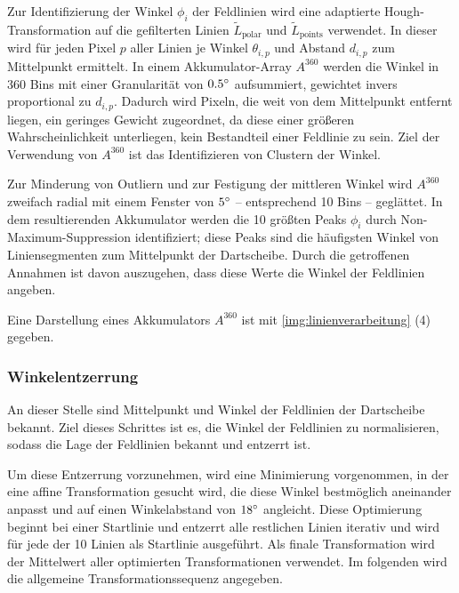 Zur Identifizierung der Winkel $\phi_i$ der Feldlinien wird eine adaptierte Hough-Transformation auf die gefilterten Linien $\widetilde{L}_\text{polar}$ und $\widetilde{L}_\text{points}$ verwendet. In dieser wird für jeden Pixel $p$ aller Linien je Winkel $\theta_{i, p}$ und Abstand $d_{i, p}$ zum Mittelpunkt ermittelt. In einem Akkumulator-Array $A^{360}$ werden die Winkel in 360 Bins mit einer Granularität von $0.5^{\circ}$ aufsummiert, gewichtet invers proportional zu $d_{i, p}$. Dadurch wird Pixeln, die weit von dem Mittelpunkt entfernt liegen, ein geringes Gewicht zugeordnet, da diese einer größeren Wahrscheinlichkeit unterliegen, kein Bestandteil einer Feldlinie zu sein. Ziel der Verwendung von $A^{360}$ ist das Identifizieren von Clustern der Winkel.

Zur Minderung von Outliern und zur Festigung der mittleren Winkel wird $A^{360}$ zweifach radial mit einem Fenster von $5^{\circ}$ -- entsprechend 10 Bins -- geglättet. In dem resultierenden Akkumulator werden die 10 größten Peaks $\phi_i$ durch Non-Maximum-Suppression identifiziert; diese Peaks sind die häufigsten Winkel von Liniensegmenten zum Mittelpunkt der Dartscheibe. Durch die getroffenen Annahmen ist davon auszugehen, dass diese Werte die Winkel der Feldlinien angeben.

Eine Darstellung eines Akkumulators $A^{360}$ ist mit \autoref{img:linienverarbeitung} (4) gegeben.

\subsubsection{Winkelentzerrung}
\label{sec:winkelentzerrung}

An dieser Stelle sind Mittelpunkt und Winkel der Feldlinien der Dartscheibe bekannt. Ziel dieses Schrittes ist es, die Winkel der Feldlinien zu normalisieren, sodass die Lage der Feldlinien bekannt und entzerrt ist.

Um diese Entzerrung vorzunehmen, wird eine Minimierung vorgenommen, in der eine affine Transformation gesucht wird, die diese Winkel bestmöglich aneinander anpasst und auf einen Winkelabstand von $18^{\circ}$ angleicht. Diese Optimierung beginnt bei einer Startlinie und entzerrt alle restlichen Linien iterativ und wird für jede der 10 Linien als Startlinie ausgeführt. Als finale Transformation wird der Mittelwert aller optimierten Transformationen verwendet. Im folgenden wird die allgemeine Transformationssequenz angegeben.

